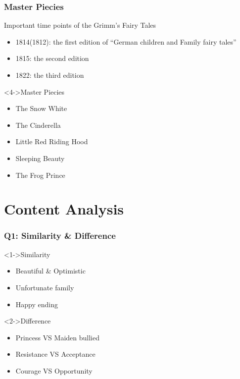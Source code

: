 \documentclass{beamer}
\begin{document}
\begin{frame}
    \frametitle{Master Piecies}
    \begin{block}{Important time points of the Grimm's Fairy Tales}
        \begin{itemize}
            \item<1-> 1814(1812): the first edition of ``German children and Family fairy tales''\cite[baidu]{baidubaike} \cite[wiki]{wikipedia}
            \item<2-> 1815: the second edition
            \item<3-> 1822: the third edition %
        \end{itemize}
    \end{block}
    \begin{block}<4->{Master Piecies}
        \begin{itemize}
            \item<5-> \alert{The Snow White}
            \item<5-> \alert{The Cinderella}
            \item<4-> Little Red Riding Hood
            \item<4-> Sleeping Beauty
            \item<4-> The Frog Prince
        \end{itemize}
    \end{block}
\end{frame}

\section{Content Analysis}

\begin{frame}
    \frametitle{Q1: Similarity \& Difference}
    \begin{block}<1->{Similarity}
        \begin{itemize}
            \item Beautiful \& Optimistic
            \item Unfortunate family
            \item Happy ending
        \end{itemize}
    \end{block}
    \begin{block}<2->{Difference}
        \begin{itemize}
            \item Princess \alert{VS} Maiden bullied
            \item Resistance \alert{VS} Acceptance
            \item Courage \alert{VS} Opportunity
        \end{itemize}
    \end{block}
\end{frame}
\end{document}
